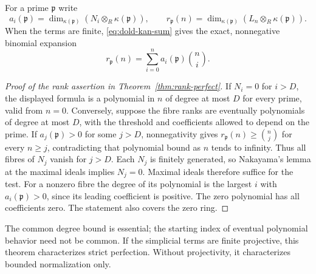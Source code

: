\documentclass[11pt,a4paper]{article}
\theoremstyle{definition}
\begin{document}
For a prime $\mathfrak p$ write
\[
 a_i(\mathfrak p)=\dim_{\kappa(\mathfrak p)}
       (N_i\otimes_R\kappa(\mathfrak p)),\qquad
 r_{\mathfrak p}(n)=\dim_{\kappa(\mathfrak p)}
       (L_n\otimes_R\kappa(\mathfrak p)).
\]
When the terms are finite, \eqref{eq:dold-kan-sum} gives the exact,
nonnegative binomial expansion
\begin{equation}\label{eq:fibre-rank}
 r_{\mathfrak p}(n)=\sum_{i=0}^n a_i(\mathfrak p)\binom ni.
\end{equation}
\begin{proof}[Proof of the rank assertion in Theorem~\ref{thm:rank-perfect}]
If $N_i=0$ for $i>D$, the displayed formula is a polynomial in $n$
of degree at most $D$ for every prime, valid from $n=0$. Conversely,
suppose the fibre ranks are eventually polynomials of degree at most
$D$, with the threshold and coefficients allowed to depend on the
prime. If $a_j(\mathfrak p)>0$ for some $j>D$, nonnegativity gives
$r_{\mathfrak p}(n)\ge\binom nj$ for every $n\ge j$, contradicting
that polynomial bound as $n$ tends to infinity. Thus all fibres of
$N_j$ vanish for $j>D$. Each $N_j$ is finitely generated, so
Nakayama's lemma at the maximal ideals implies $N_j=0$. Maximal
ideals therefore suffice for the test. For a nonzero fibre the degree
of its polynomial is the largest $i$ with $a_i(\mathfrak p)>0$,
since its leading coefficient is positive. The zero polynomial has
all coefficients zero. The statement also covers the zero ring.
\end{proof}
The common degree bound is essential; the starting index of eventual
polynomial behavior need not be common. If the simplicial terms are
finite projective, this theorem characterizes strict perfection.
Without projectivity, it characterizes bounded normalization only.
\end{document}
